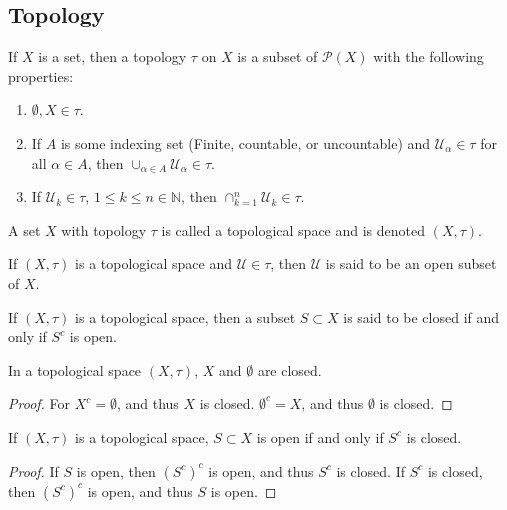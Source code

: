 \documentclass[crop=false,class=book,oneside]{standalone}
\begin{document}
        \subsection{Topology}
            \begin{definition}
            If $X$ is a set, then a topology $\tau$ on $X$ is a subset of $\mathcal{P}(X)$ with the following properties:
            \begin{enumerate}
            \item $\emptyset, X\in \tau$.
            \item If $A$ is some indexing set (Finite, countable, or uncountable) and $\mathcal{U}_\alpha \in \tau$ for all $\alpha \in A$, then $\cup_{\alpha \in A} \mathcal{U}_{\alpha} \in \tau$.
            \item If $\mathcal{U}_k\in \tau$, $1\leq k \leq n\in \mathbb{N}$, then $\cap_{k=1}^{n}\mathcal{U}_k \in \tau$.
            \end{enumerate}
            \end{definition}
            \begin{definition}
            A set $X$ with topology $\tau$ is called a topological space and is denoted $(X,\tau)$.
            \end{definition}
            \begin{definition}
            If $(X,\tau)$ is a topological space and $\mathcal{U}\in \tau$, then $\mathcal{U}$ is said to be an open subset of $X$.
            \end{definition}
            \begin{definition}
            If $(X,\tau)$ is a topological space, then a subset $S\subset X$ is said to be closed if and only if $S^c$ is open.
            \end{definition}
            \begin{theorem}
            In a topological space $(X,\tau)$, $X$ and $\emptyset$ are closed.
            \end{theorem}
            \begin{proof}
            For $X^c = \emptyset$, and thus $X$ is closed. $\emptyset^c=X$, and thus $\emptyset$ is closed.
            \end{proof}
            \begin{theorem}
            If $(X,\tau)$ is a topological space, $S\subset X$ is open if and only if $S^c$ is closed.
            \end{theorem}
            \begin{proof}
            If $S$ is open, then $(S^c)^c$ is open, and thus $S^c$ is closed. If $S^c$ is closed, then $(S^c)^c$ is open, and thus $S$ is open.
            \end{proof}
\end{document}
